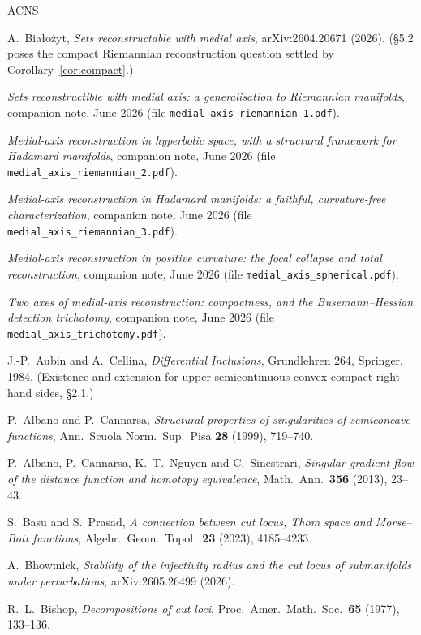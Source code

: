 \documentclass[11pt]{article}
\theoremstyle{remark}
\begin{document}
\begin{thebibliography}{ACNS}

 A.~Bia\l{}o\.zyt, \emph{Sets reconstructable with
medial axis}, arXiv:2604.20671 (2026). (\S5.2 poses the compact
Riemannian reconstruction question settled by
Corollary~\ref{cor:compact}.)

 \emph{Sets reconstructible with medial axis: a
generalisation to Riemannian manifolds}, companion note, June 2026
(file \texttt{medial\_axis\_riemannian\_1.pdf}).

 \emph{Medial-axis reconstruction in hyperbolic space,
with a structural framework for Hadamard manifolds}, companion note,
June 2026 (file \texttt{medial\_axis\_riemannian\_2.pdf}).

 \emph{Medial-axis reconstruction in Hadamard manifolds: a
faithful, curvature-free characterization}, companion note, June 2026
(file \texttt{medial\_axis\_riemannian\_3.pdf}).

 \emph{Medial-axis reconstruction in positive curvature:
the focal collapse and total reconstruction}, companion note, June
2026 (file \texttt{medial\_axis\_spherical.pdf}).

 \emph{Two axes of medial-axis reconstruction:
compactness, and the Busemann--Hessian detection trichotomy},
companion note, June 2026 (file
\texttt{medial\_axis\_trichotomy.pdf}).

 J.-P.~Aubin and A.~Cellina, \emph{Differential
Inclusions}, Grundlehren 264, Springer, 1984. (Existence and extension
for upper semicontinuous convex compact right-hand sides, \S2.1.)

 P.~Albano and P.~Cannarsa, \emph{Structural properties
of singularities of semiconcave functions}, Ann.\ Scuola Norm.\ Sup.\
Pisa \textbf{28} (1999), 719--740.

 P.~Albano, P.~Cannarsa, K.~T.~Nguyen and
C.~Sinestrari, \emph{Singular gradient flow of the distance function
and homotopy equivalence}, Math.\ Ann.\ \textbf{356} (2013), 23--43.

 S.~Basu and S.~Prasad, \emph{A connection between cut
locus, Thom space and Morse--Bott functions}, Algebr.\ Geom.\
Topol.\ \textbf{23} (2023), 4185--4233.

 A.~Bhowmick, \emph{Stability of the injectivity
radius and the cut locus of submanifolds under perturbations},
arXiv:2605.26499 (2026).

 R.~L.~Bishop, \emph{Decompositions of cut loci},
Proc.\ Amer.\ Math.\ Soc.\ \textbf{65} (1977), 133--136.


\end{thebibliography}
\end{document}
